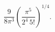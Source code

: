 \begin{equation}
\frac{9}{8 \pi^3} \left(\frac{\pi^5}{2^4 \, 5!}\right)^{1/4} . 	\label{5-12}
\end{equation}

